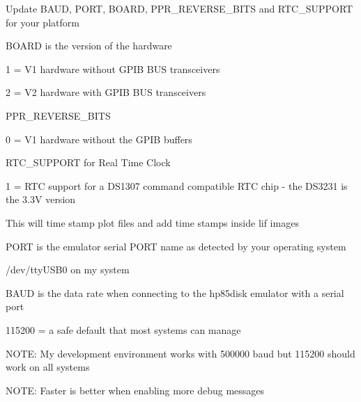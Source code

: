 \begin{DoxyItemize}
\item Update B\+A\+UD, P\+O\+RT, B\+O\+A\+RD, P\+P\+R\+\_\+\+R\+E\+V\+E\+R\+S\+E\+\_\+\+B\+I\+TS and R\+T\+C\+\_\+\+S\+U\+P\+P\+O\+RT for your platform
\begin{DoxyItemize}
\item B\+O\+A\+RD is the version of the hardware
\begin{DoxyItemize}
\item 1 = V1 hardware without G\+P\+IB B\+US transceivers
\item 2 = V2 hardware with G\+P\+IB B\+US transceivers
\end{DoxyItemize}
\item P\+P\+R\+\_\+\+R\+E\+V\+E\+R\+S\+E\+\_\+\+B\+I\+TS
\begin{DoxyItemize}
\item 0 = V1 hardware without the G\+P\+IB buffers
\end{DoxyItemize}
\item R\+T\+C\+\_\+\+S\+U\+P\+P\+O\+RT for Real Time Clock
\begin{DoxyItemize}
\item 1 = R\+TC support for a D\+S1307 command compatible R\+TC chip -\/ the D\+S3231 is the 3.\+3V version
\begin{DoxyItemize}
\item This will time stamp plot files and add time stamps inside lif images
\end{DoxyItemize}
\end{DoxyItemize}
\item P\+O\+RT is the emulator serial P\+O\+RT name as detected by your operating system
\begin{DoxyItemize}
\item /dev/tty\+U\+S\+B0 on my system
\end{DoxyItemize}
\item B\+A\+UD is the data rate when connecting to the hp85disk emulator with a serial port
\begin{DoxyItemize}
\item 115200 = a safe default that most systems can manage
\begin{DoxyItemize}
\item N\+O\+TE\+: My development environment works with 500000 baud but 115200 should work on all systems
\item N\+O\+TE\+: Faster is better when enabling more debug messages
\begin{DoxyItemize}

\end{DoxyItemize}
\end{DoxyItemize}
\end{DoxyItemize}
\end{DoxyItemize}
\end{DoxyItemize}
